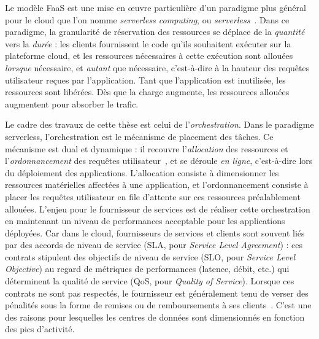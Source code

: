 Le modèle FaaS est une mise en œuvre particulière d'un paradigme plus général pour le cloud que l'on nomme \textit{serverless computing}, ou \textit{serverless}~\cite{hellersteinServerlessComputingOne2019}. Dans ce paradigme, la granularité de réservation des ressources se déplace de la \textit{quantité} vers la \textit{durée} : les clients fournissent le code qu'ils souhaitent exécuter sur la plateforme cloud, et les ressources nécessaires à cette exécution sont allouées \textit{lorsque} nécessaire, et \textit{autant} que nécessaire, c'est-à-dire à la hauteur des requêtes utilisateur reçues par l'application. Tant que l'application est inutilisée, les ressources sont libérées. Dès que la charge augmente, les ressources allouées augmentent pour absorber le trafic.

Le cadre des travaux de cette thèse est celui de l'\textit{orchestration}. Dans le paradigme serverless, l'orchestration est le mécanisme de placement des tâches. Ce mécanisme est dual et dynamique : il recouvre l'\textit{allocation} des ressources et l'\textit{ordonnancement} des requêtes utilisateur~\cite{vaneykSPECRGReferenceArchitecture2019}, et se déroule \textit{en ligne}, c'est-à-dire lors du déploiement des applications. L'allocation consiste à dimensionner les ressources matérielles affectées à une application, et l'ordonnancement consiste à placer les requêtes utilisateur en file d'attente sur ces ressources préalablement allouées. L'enjeu pour le fournisseur de services est de réaliser cette orchestration en maintenant un niveau de performances acceptable pour les applications déployées. Car dans le cloud, fournisseurs de services et clients sont souvent liés par des accords de niveau de service (SLA, pour \textit{Service Level Agreement}) : ces contrats stipulent des objectifs de niveau de service (SLO, pour \textit{Service Level Objective}) au regard de métriques de performances (latence, débit, etc.) qui déterminent la qualité de service (QoS, pour \textit{Quality of Service}). Lorsque ces contrats ne sont pas respectés, le fournisseur est généralement tenu de verser des pénalités sous la forme de remises ou de remboursements à ses clients~\cite{buyyaSLAorientedResourceProvisioning2011}. C'est une des raisons pour lesquelles les centres de données sont dimensionnés en fonction des pics d'activité.

